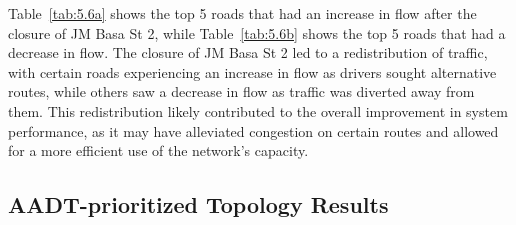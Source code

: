 \begin{table}[H]
    \centering
    \renewcommand{\thetable}{4.6b}
    \caption{Top 5 Roads With Decrease in Flow After Closure of JM Basa St 2}
    \label{tab:5.6b}
\end{table}

Table~\ref{tab:5.6a} shows the top 5 roads that had an increase in flow after the closure of JM Basa St 2, while Table~\ref{tab:5.6b} shows the top 5 roads that had a decrease in flow. The closure of JM Basa St 2 led to a redistribution of traffic, with certain roads experiencing an increase in flow as drivers sought alternative routes, while others saw a decrease in flow as traffic was diverted away from them. This redistribution likely contributed to the overall improvement in system performance, as it may have alleviated congestion on certain routes and allowed for a more efficient use of the network's capacity.

\subsection{AADT-prioritized Topology Results}
\label{sec:aadt-prioritized}

